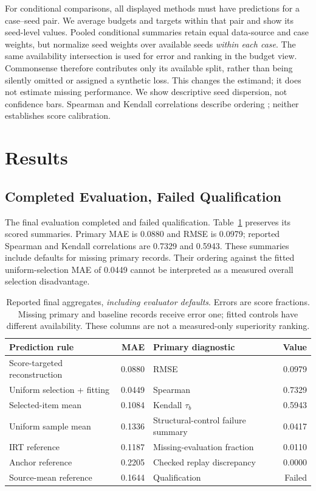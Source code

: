 \documentclass{article}
\begin{document}
For conditional comparisons, all displayed methods must have predictions for a case--seed pair. We average budgets and targets within that pair and show its seed-level values. Pooled conditional summaries retain equal data-source and case weights, but normalize seed weights over available seeds \emph{within each case}. The same availability intersection is used for error and ranking in the budget view. Commonsense therefore contributes only its available split, rather than being silently omitted or assigned a synthetic loss. This changes the estimand; it does not estimate missing performance. We show descriptive seed dispersion, not confidence bars. Spearman and Kendall correlations describe ordering \citep{Spearman1904,Kendall1938}; neither establishes score calibration.

\section{Results}
\subsection{Completed Evaluation, Failed Qualification}
The final evaluation completed and failed qualification. Table~\ref{tab:aggregate} preserves its scored summaries. Primary MAE is 0.0880 and RMSE is 0.0979; reported Spearman and Kendall correlations are 0.7329 and 0.5943. These summaries include defaults for missing primary records. Their ordering against the fitted uniform-selection MAE of 0.0449 cannot be interpreted as a measured overall selection disadvantage.

\begin{table}[t]
\centering
\caption{Reported final aggregates, \emph{including evaluator defaults}. Errors are score fractions. Missing primary and baseline records receive error one; fitted controls have different availability. These columns are not a measured-only superiority ranking.}
\label{tab:aggregate}
\begin{tabular}{lr@{\qquad}lr}
\toprule
Prediction rule & MAE & Primary diagnostic & Value\\
\midrule
Score-targeted reconstruction & 0.0880 & RMSE & 0.0979\\
Uniform selection + fitting & 0.0449 & Spearman & 0.7329\\
Selected-item mean & 0.1084 & Kendall $\tau_b$ & 0.5943\\
Uniform sample mean & 0.1336 & Structural-control failure summary & 0.0417\\
IRT reference & 0.1187 & Missing-evaluation fraction & 0.0110\\
Anchor reference & 0.2205 & Checked replay discrepancy & 0.0000\\
Source-mean reference & 0.1644 & Qualification & Failed\\
\bottomrule
\end{tabular}
\end{table}
\end{document}
